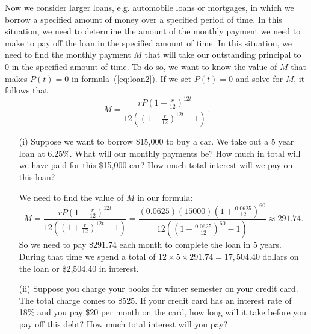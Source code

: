 \begin{exercises}
\begin{exerciseSolution}
\vs
\end{exerciseSolution}

    \item Now we consider larger loans, e.g. automobile loans or mortgages, in which we borrow a specified amount of money over a specified period of time. In this situation, we need to determine the amount of the monthly payment we need to make to pay off the loan in the specified amount of time.  In this situation, we need to find the monthly payment $M$ that will take our outstanding principal to $0$ in the specified amount of time.  To do so, we want to know the value of $M$ that makes $P(t) = 0$ in formula~(\ref{eq:loan2}).  If we set $P(t) = 0$ and solve for $M$, it follows that
$$
M = \frac{rP \left(1+\frac{r}{12}\right)^{12t}}{12\left(\left(1+\frac{r}{12}\right)^{12t} - 1 \right)}.
$$

   \begin{itemize}
    \item[(i)] Suppose we want to borrow \$15,000 to buy a car. We take out a 5 year loan at 6.25\%. What will our monthly payments be? How much in total will we have paid for this \$15,000 car? How much total interest will we pay on this loan?

\begin{exerciseSolution}
\vs

We need to find the value of $M$ in our formula:
\[M = \frac{rP \left(1+\frac{r}{12}\right)^{12t}}{12\left(\left(1+\frac{r}{12}\right)^{12t} - 1 \right)} = \frac{(0.0625)(15000)\left(1+\frac{0.0625}{12}\right)^{60}}{12\left(\left(1+\frac{0.0625}{12}\right)^{60} - 1 \right)} \approx 291.74.\]
So we need to pay \$291.74 each month to complete the loan in 5 years. During that time we spend a total of $12 \times 5 \times 291.74 = 17,504.40$ dollars on the loan or \$2,504.40 in interest.

\vs
\end{exerciseSolution}

    \item[(ii)] Suppose you charge your books for winter semester on your credit card. The total charge comes to \$525. If your credit card has an interest rate of 18\% and you pay \$20 per month on the card, how long will it take before you pay off this debt? How much total interest will you pay?


\end{itemize}
\end{exercises}
